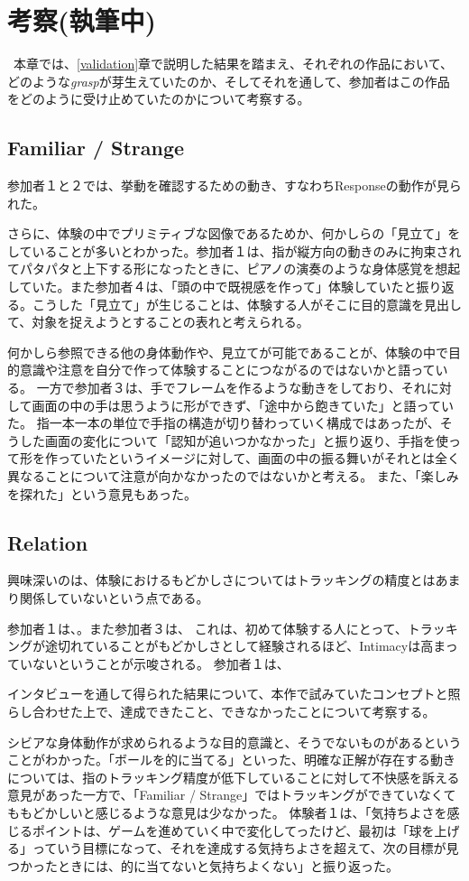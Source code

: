 \chapter{考察(執筆中)}
\label{考察}
\
本章では、\ref{validation}章で説明した結果を踏まえ、それぞれの作品において、どのような\textit{grasp}が芽生えていたのか、そしてそれを通して、参加者はこの作品をどのように受け止めていたのかについて考察する。

\section{Familiar / Strange}
参加者１と２では、挙動を確認するための動き、すなわちResponseの動作が見られた。

さらに、体験の中でプリミティブな図像であるためか、何かしらの「見立て」をしていることが多いとわかった。参加者１は、指が縦方向の動きのみに拘束されてパタパタと上下する形になったときに、ピアノの演奏のような身体感覚を想起していた。また参加者４は、「頭の中で既視感を作って」体験していたと振り返る。こうした「見立て」が生じることは、体験する人がそこに目的意識を見出して、対象を捉えようとすることの表れと考えられる。

何かしら参照できる他の身体動作や、見立てが可能であることが、体験の中で目的意識や注意を自分で作って体験することにつながるのではないかと語っている。
一方で参加者３は、手でフレームを作るような動きをしており、それに対して画面の中の手は思うように形ができず、「途中から飽きていた」と語っていた。
指一本一本の単位で手指の構造が切り替わっていく構成ではあったが、そうした画面の変化について「認知が追いつかなかった」と振り返り、手指を使って形を作っていたというイメージに対して、画面の中の振る舞いがそれとは全く異なることについて注意が向かなかったのではないかと考える。
また、「楽しみを探れた」という意見もあった。
\section{Relation}
興味深いのは、体験におけるもどかしさについてはトラッキングの精度とはあまり関係していないという点である。

参加者１は、。また参加者３は、
これは、初めて体験する人にとって、トラッキングが途切れていることがもどかしさとして経験されるほど、Intimacyは高まっていないということが示唆される。
参加者１は、

インタビューを通して得られた結果について、本作で試みていたコンセプトと照らし合わせた上で、達成できたこと、できなかったことについて考察する。

シビアな身体動作が求められるような目的意識と、そうでないものがあるということがわかった。「ボールを的に当てる」といった、明確な正解が存在する動きについては、指のトラッキング精度が低下していることに対して不快感を訴える意見があった一方で、「Familiar / Strange」ではトラッキングができていなくてももどかしいと感じるような意見は少なかった。
体験者１は、「気持ちよさを感じるポイントは、ゲームを進めていく中で変化してったけど、最初は「球を上げる」っていう目標になって、それを達成する気持ちよさを超えて、次の目標が見つかったときには、的に当てないと気持ちよくない」と振り返った。

